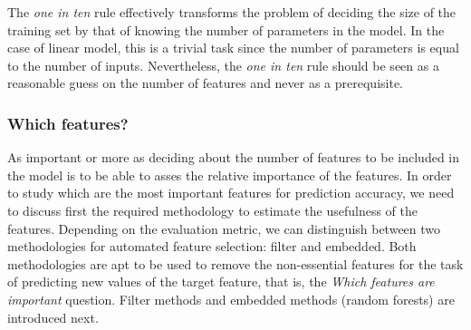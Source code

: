 \documentclass[preprint,12pt]{elsarticle}
\begin{document}
The \emph{one in ten} rule effectively transforms the problem of deciding the size of the training set by that of knowing the number of parameters in the model. In the case of linear model, this is a trivial task since the number of parameters is equal to the number of inputs. 
Nevertheless, the \emph{one in ten} rule should be seen as a reasonable guess on the number of features and never as a prerequisite.

\subsubsection{Which features?}
\label{sse:Which}
As important or more as deciding about the number of features to be included in the model is to be able to asses the relative importance of the features. In order to study which are the most important features for prediction accuracy, we need to discuss first the required methodology to estimate the usefulness of the features. 
Depending on the evaluation metric, we can distinguish between two methodologies for automated feature selection: filter and embedded. Both methodologies are apt to be used to remove the non-essential features for the task of predicting new values of the target feature, that is, the \emph{Which features are important} question. Filter methods and embedded methods (random forests) are introduced next.


\end{document}
